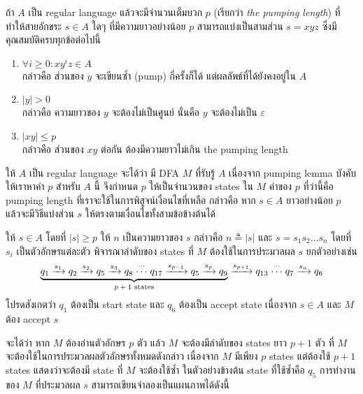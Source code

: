 \begin{theorem}
ถ้า $A$ เป็น regular language แล้วจะมีจำนวนเต็มบวก $p$ (เรียกว่า \emph{the pumping length}) ที่ทำให้สายอักขระ $s\in A$ ใดๆ ที่มีความยาวอย่างน้อย $p$ สามารถแบ่งเป็นสามส่วน $s=xyz$ ซึ่งมีคุณสมบัติครบทุกข้อต่อไปนี้
\begin{enumerate}
\item $\forall i\geq 0: xy^iz\in A$ \label{pumping:pumped} \\
กล่าวคือ ส่วนของ $y$ จะเขียนซ้ำ (pump) กี่ครั้งก็ได้ แต่ผลลัพธ์ที่ได้ยังคงอยู่ใน $A$
\item $|y|>0$ \label{pumping:middle} \\
กล่าวคือ ความยาวของ $y$ จะต้องไม่เป็นศูนย์ นั่นคือ $y$ จะต้องไม่เป็น $\varepsilon$
\item $|xy|\leq p$ \label{pumping:short} \\
กล่าวคือ ส่วนของ $xy$ ต่อกัน ต้องมีความยาวไม่เกิน the pumping length
\end{enumerate}
\begin{pf}
ให้ $A$ เป็น regular language จะได้ว่า มี DFA $M$ ที่รับรู้ $A$ \enskip เนื่องจาก pumping lemma บังคับให้เราหาค่า $p$ สำหรับ $A$ นี้ จึงกำหนด $p$ ให้เป็นจำนวนของ states ใน $M$ \enskip ค่าของ $p$ ที่ว่านี้คือ pumping length ที่เราจะใช้ในการพิสูจน์เงื่อนไขที่เหลือ กล่าวคือ หาก $s\in A$ ยาวอย่างน้อย $p$ แล้วจะมีวิธีแบ่งส่วน $s$ ให้ตรงตามเงื่อนไขทั้งสามข้อข้างต้นได้

ให้ $s\in A$ โดยที่ $|s|\geq p$ \enskip ให้ $n$ เป็นความยาวของ $s$ กล่าวคือ $n\triangleq |s|$ และ $s=s_1s_2\ldots s_n$ โดยที่ $s_i$ เป็นตัวอักษรแต่ละตัว \enskip พิจารณาลำดับของ states ที่ $M$ ต้องใช้ในการประมวลผล $s$ ยกตัวอย่างเช่น
\[
\underbrace{q_1\xrightarrow{s_1} q_2\xrightarrow{s_2} q_5\xrightarrow{s_3} q_8 \stackrel{\cdots}{\cdots} q_{17}\xrightarrow{s_{p-1}} q_5\xrightarrow{s_p} q_9}_{\textup{$p+1$ states}}\xrightarrow{s_{p+1}} q_{13} \stackrel{\cdots}{\cdots} q_7\xrightarrow{s_n} q_6
\]
โปรดสังเกตว่า $q_1$ ต้องเป็น start state และ $q_6$ ต้องเป็น accept state เนื่องจาก $s\in A$ และ $M$ ต้อง accept $s$

จะได้ว่า หาก $M$ ต้องอ่านตัวอักษร $p$ ตัว แล้ว $M$ จะต้องมีลำดับของ states ยาว $p+1$ ตัว ที่ $M$ จะต้องใช้ในการประมวลผลตัวอักษรทั้งหมดดังกล่าว \enskip เนื่องจาก $M$ มีเพียง $p$ states แต่ต้องใช้ $p+1$ states แสดงว่าจะต้องมี state ที่ $M$ จะต้องใช้ซ้ำ \enskip ในตัวอย่างข้างต้น state ที่ใช้ซ้ำคือ $q_5$ \enskip การทำงานของ $M$ ที่ประมวลผล $s$ สามารถเขียนจำลองเป็นแผนภาพได้ดังนี้
\begin{center}
\end{center}
\end{pf}
\end{theorem}

